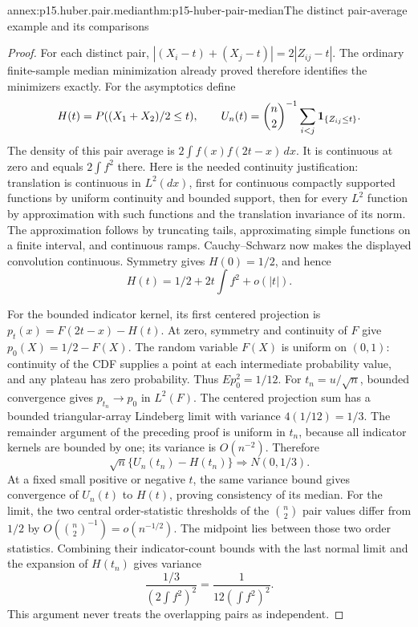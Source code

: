 \begin{annexitem}{annex:p15.huber.pair.median}{thm:p15-huber-pair-median}{The distinct pair-average example and its comparisons}
\begin{proof}
For each distinct pair,
\(|(X_i-t)+(X_j-t)|=2|Z_{ij}-t|\).
The ordinary finite-sample median minimization already proved
therefore identifies the minimizers exactly.
For the asymptotics define
\[
 H(t)=P((X_1+X_2)/2\leq t),\qquad
 U_n(t)=\binom n2^{-1}\sum_{i<j}{\bf1}_{\{Z_{ij}\leq t\}}.
\]
The density of this pair average is
\(2\int f(x)f(2t-x)\,dx\). It is continuous at zero and equals
\(2\int f^2\) there. Here is the needed continuity justification:
translation is continuous in \(L^2(dx)\), first for continuous
compactly supported functions by uniform continuity and bounded
support, then for every \(L^2\) function by approximation with
such functions and the translation invariance of its norm.
The approximation follows by truncating tails, approximating
simple functions on a finite interval, and continuous ramps.
Cauchy--Schwarz now makes the displayed convolution continuous.
Symmetry gives \(H(0)=1/2\), and hence
\[
 H(t)=1/2+2t\int f^2+o(|t|).
\]

For the bounded indicator kernel, its first centered projection is
\(p_t(x)=F(2t-x)-H(t)\).
At zero, symmetry and continuity of \(F\) give
\(p_0(X)=1/2-F(X)\).
The random variable \(F(X)\) is uniform on \((0,1)\):
continuity of the CDF supplies a point at each intermediate
probability value, and any plateau has zero probability.
Thus \(Ep_0^2=1/12\).
For \(t_n=u/\sqrt n\), bounded convergence gives
\(p_{t_n}\to p_0\) in \(L^2(F)\).
The centered projection sum has a bounded triangular-array
Lindeberg limit with variance \(4(1/12)=1/3\).
The remainder argument of the preceding proof is uniform in
\(t_n\), because all indicator kernels are bounded by one;
its variance is \(O(n^{-2})\). Therefore
\[
 \sqrt n\{U_n(t_n)-H(t_n)\}\Longrightarrow N(0,1/3).
\]
At a fixed small positive or negative \(t\), the same variance
bound gives convergence of \(U_n(t)\) to \(H(t)\), proving
consistency of its median.
For the limit, the two central order-statistic thresholds of
the \(\binom n2\) pair values differ from \(1/2\) by
\(O(\binom n2^{-1})=o(n^{-1/2})\).
The midpoint lies between those two order statistics.
Combining their indicator-count bounds with the last normal limit
and the expansion of \(H(t_n)\) gives variance
\[
 \frac{1/3}{(2\int f^2)^2}
             =\frac1{12(\int f^2)^2}.
\]
This argument never treats the overlapping pairs as independent.


\end{proof}
\end{annexitem}
